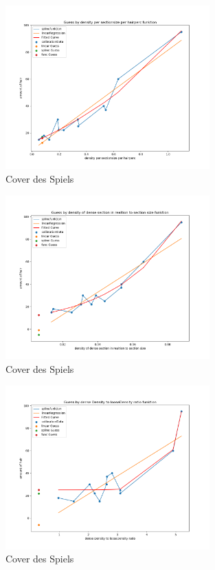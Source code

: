 \documentclass[german,a4paper,12pt,smallheadings,headsepline, titlepage, liststotoc, idextotoc,bibtoctoc,blibliography = totocnumbered]{scrartcl}
\begin{document}
\begin{figure}
	\centering
	\includegraphics[width=0.7\textwidth]{fig64/g03_densitynorm2.png}
	\caption[]{Cover des Spiels}
	\label{img:cover}
\end{figure}
\begin{figure}
	\centering
	\includegraphics[width=0.7\textwidth]{fig64/g04_densityDenseSections.png}
	\caption[]{Cover des Spiels}
	\label{img:cover}
\end{figure}
\begin{figure}
	\centering
	\includegraphics[width=0.7\textwidth]{fig64/g05_denseDensitytolooseDensity.png}
	\caption[]{Cover des Spiels}
	\label{img:cover}
\end{figure}
\end{document}
